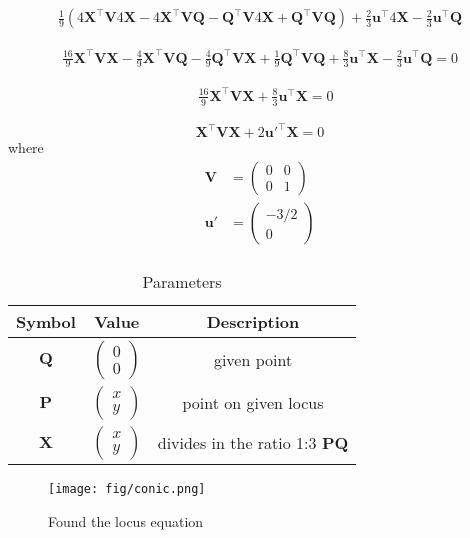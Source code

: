 \documentclass[journal,10pt,twocolumn]{article}
\newcommand{\myvec}[1]{\ensuremath{\begin{pmatrix}#1\end{pmatrix}}}
\let\vec\mathbf
\let\vec\mathbf
\begin{document}
\begin{multline}
    \label{eq:conic_quad_form}
    \frac{1}{9}(4\vec{X}^{\top}\vec{V}4\vec{X}-4\vec{X}^{\top}\vec{V}\vec{Q}-\vec{Q}^{\top}\vec{V}4\vec{X}+\vec{Q}^{\top}\vec{V}\vec{Q}) + \frac{2}{3}\vec{u}^{\top}4\vec{X}-\frac{2}{3}\vec{u}^{\top}\vec{Q}
    \end{multline}

\begin{multline}
    \label{eq:conic_quad_form}
	\frac{16}{9}\vec{X}^{\top}\vec{V}\vec{X}-\frac{4}{9}\vec{X}^{\top}\vec{V}\vec{Q}-\frac{4}{9}\vec{Q}^{\top}\vec{V}\vec{X}+\frac{1}{9}\vec{Q}^{\top}\vec{V}\vec{Q}+\frac{8}{3}\vec{u}^{\top}\vec{X}-\frac{2}{3}\vec{u}^{\top}\vec{Q}=0
    \end{multline}
 
\begin{align*}
    \label{eq:conic_quad_form}
	&\frac{16}{9}\vec{X}^{\top}\vec{V}\vec{X}+\frac{8}{3}\vec{u}^{\top}\vec{X}=0
    \end{align*}
        
\begin{equation}
    \label{eq:conic_quad_form}
	\vec{X}^{\top}\vec{V}\vec{X}+2\vec{u'}^{\top}\vec{X}=0
\end{equation}
where
\begin{align}
	\vec{V} &= \myvec{0 & 0\\0 & 1}\\
	\vec{u'} &=\myvec{-3/2\\0}\\
\end{align}
{\begin{table}[h]
    \centering
    \begin{tabular}{|c|c|c|}
       \hline
       \textbf{Symbol}&\textbf{Value}&\textbf{Description}  \\
       \hline
	    $\vec{Q}$ & $\myvec{
		    0\\
		    0}$
	    & given point\\
        \hline
	    $\vec{P}$ & $\myvec{x\\y}$
 &  point on given locus \\
        \hline
	    $\vec{X}$ & $\myvec{x\\y}$
 & divides in the ratio 1:3 $\vec{PQ}$  \\
       \hline
    \end{tabular}
    \caption{Parameters}
    \label{tab:my_label}
\end{table}

\begin{figure}[h]
    \centering
\texttt{[image: fig/conic.png]}
    \caption{Found the locus equation }
    \label{fig:my_label}
\end{figure}

}
\end{document}
